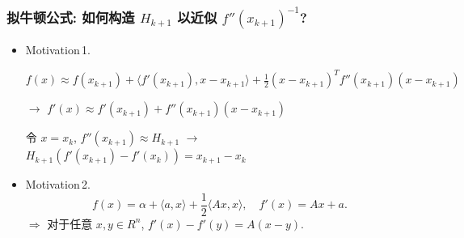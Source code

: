 \documentclass[handout,10pt]{beamer} %
\begin{document}
\begin{frame}[fragile]
\frametitle{拟牛顿公式: 如何构造 $H_{k+1}$ 以近似 $f''(x_{k+1})^{-1}$? }


\begin{itemize}
	\item Motivation\,1. 

$f(x) \approx f(x_{k+1}) + \langle f'(x_{k+1}),x-x_{k+1}\rangle 
+ \frac{1}{2} (x-x_{k+1})^{T} f''(x_{k+1}) (x-x_{k+1})$

$\rightarrow$ $f'(x) \approx    f'(x_{k+1}) 
+     f''(x_{k+1}) (x-x_{k+1})$ 



 

 令 $ x = x_k   $,  $f''(x_{k+1}) \approx H_{k+1}$
     $\rightarrow$	 
  $  H_{k+1}^{} (f'(x_{k+1}^{}) - f'(x_k) ) =  x_{k+1}^{}- x_{k}^{} $   
	
\item Motivation\,2. 
$$
    f(x) = \alpha + \langle a,x\rangle + \frac{1}{2}\langle Ax,x\rangle,
    \quad f'(x) = Ax+a.
$$
$\Rightarrow$ 对于任意 $x,y \in R^n$,
$f'(x)-f'(y) = A(x-y)$.


\end{itemize}

%


%

\end{frame}
\end{document}
